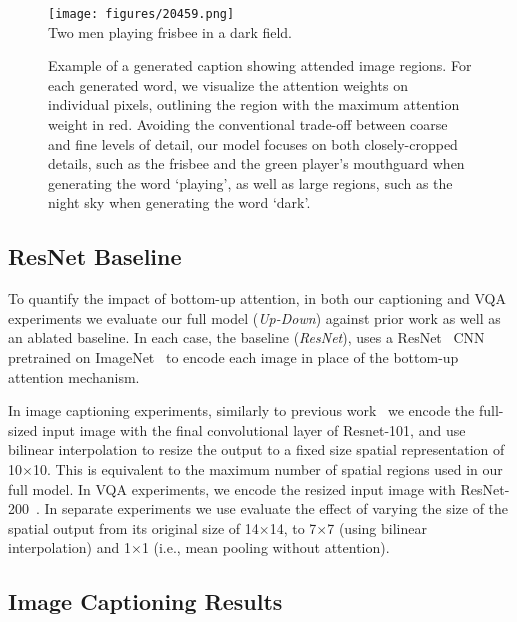 \documentclass[10pt,twocolumn,letterpaper]{article}
\begin{document}
\begin{figure*}
	\begin{center}
		\texttt{[image: figures/20459.png]}\\
		Two men playing frisbee in a dark field.
	\end{center}
	\caption{Example of a generated caption showing attended image regions. For each generated word, we visualize the attention weights on individual pixels, outlining the region with the maximum attention weight in red. Avoiding the conventional trade-off between coarse and fine levels of detail, our model focuses on both closely-cropped details, such as the frisbee and the green player's mouthguard when generating the word `playing', as well as large regions, such as the night sky when generating the word `dark'.  }
	\label{fig:caption_example}
\end{figure*}

\subsection{ResNet Baseline}

To quantify the impact of bottom-up attention, in both our captioning and VQA experiments we evaluate our full model (\textit{Up-Down}) against prior work as well as an ablated baseline. In each case, the baseline (\textit{ResNet}), uses a ResNet~\cite{he2015deep} CNN pretrained on ImageNet~\cite{ILSVRC15} to encode each image in place of the bottom-up attention mechanism. 

In image captioning experiments, similarly to previous work~\cite{scst2016} we encode the full-sized input image with the final convolutional layer of Resnet-101, and use bilinear interpolation to resize the output to a fixed size spatial representation of 10$\times$10. This is equivalent to the maximum number of spatial regions used in our full model. In VQA experiments, we encode the resized input image with ResNet-200~\cite{he2016identityresnet}. In separate experiments we use evaluate the effect of varying the size of the spatial output from its original size of 14$\times$14, to 7$\times$7 (using bilinear interpolation) and 1$\times$1 (i.e., mean pooling without attention).



\subsection{Image Captioning Results}
\end{document}

